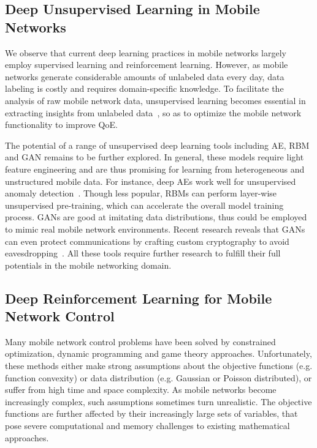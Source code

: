 \documentclass[journal,comsoc,letter]{IEEEtran}
\begin{document}
\subsection{Deep Unsupervised Learning in Mobile Networks}
We observe that current deep learning practices in mobile networks largely employ supervised learning and reinforcement learning. However, as mobile networks generate considerable amounts of unlabeled data every day, data labeling is costly and requires domain-specific knowledge. To facilitate the analysis of raw mobile network data, unsupervised learning becomes essential in extracting insights from unlabeled data~\cite{usama2017unsupervised}, so as to optimize the mobile network functionality to improve QoE. 

The potential of a range of unsupervised deep learning tools including AE, RBM and GAN remains to be further explored. In general, these models require light feature engineering and are thus promising for learning from heterogeneous and unstructured mobile data. For instance, deep AEs work well for unsupervised anomaly detection~\cite{zhou2017anomaly}. Though less popular, RBMs can perform layer-wise unsupervised pre-training, which can accelerate the overall model training process. GANs are good at imitating data distributions, thus could be employed to mimic real mobile network environments. Recent research reveals that GANs can even protect communications by crafting custom cryptography to avoid eavesdropping~\cite{abadi2016learning}. All these tools require further research to fulfill their full potentials in the mobile networking domain.

\subsection{Deep Reinforcement Learning for Mobile Network Control}
Many mobile network control problems have been solved by constrained optimization, dynamic programming and game theory approaches. Unfortunately, these methods either make strong assumptions about the objective functions (e.g. function convexity) or data distribution (e.g. Gaussian or Poisson distributed), or suffer from high time and space complexity. As mobile networks become increasingly complex, such assumptions sometimes turn unrealistic. The objective functions are further affected by their increasingly large sets of variables, that pose severe computational and memory challenges to existing mathematical approaches.   
\end{document}
